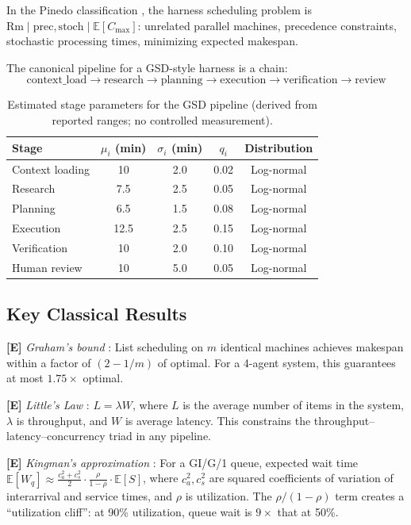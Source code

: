 \documentclass[11pt, a4paper, copyright]{googledeepmind}
\newcommand{\E}{\mathbb{E}}
\begin{document}
In the Pinedo classification \citep{pinedo2016scheduling}, the harness scheduling problem is $\mathrm{Rm} \mid \mathrm{prec}, \mathrm{stoch} \mid \E[C_{\max}]$: unrelated parallel machines, precedence constraints, stochastic processing times, minimizing expected makespan.

The canonical pipeline for a GSD-style harness is a chain:
\[
    \text{context\_load} \to \text{research} \to \text{planning} \to \text{execution} \to \text{verification} \to \text{review}
\]

\begin{table}[ht]
\centering
\caption{Estimated stage parameters for the GSD pipeline (derived from reported ranges; no controlled measurement).}\label{tab:stages}
\begin{tabular}{lcccc}
\toprule
Stage & $\mu_i$ (min) & $\sigma_i$ (min) & $q_i$ & Distribution \\
\midrule
Context loading & 10 & 2.0 & 0.02 & Log-normal \\
Research & 7.5 & 2.5 & 0.05 & Log-normal \\
Planning & 6.5 & 1.5 & 0.08 & Log-normal \\
Execution & 12.5 & 2.5 & 0.15 & Log-normal \\
Verification & 10 & 2.0 & 0.10 & Log-normal \\
Human review & 10 & 5.0 & 0.05 & Log-normal \\
\bottomrule
\end{tabular}
\end{table}

\subsection{Key Classical Results}

\textbf{[E]} \emph{Graham's bound} \citep{graham1966bounds}: List scheduling on $m$ identical machines achieves makespan within a factor of $(2 - 1/m)$ of optimal. For a 4-agent system, this guarantees at most $1.75\times$ optimal.

\textbf{[E]} \emph{Little's Law} \citep{little1961proof}: $L = \lambda W$, where $L$ is the average number of items in the system, $\lambda$ is throughput, and $W$ is average latency. This constrains the throughput--latency--concurrency triad in any pipeline.

\textbf{[E]} \emph{Kingman's approximation} \citep{kingman1961single}: For a GI/G/1 queue, expected wait time $\E[W_q] \approx \frac{c_a^2 + c_s^2}{2} \cdot \frac{\rho}{1 - \rho} \cdot \E[S]$, where $c_a^2, c_s^2$ are squared coefficients of variation of interarrival and service times, and $\rho$ is utilization. The $\rho/(1-\rho)$ term creates a ``utilization cliff'': at 90\% utilization, queue wait is $9\times$ that at 50\%.
\end{document}
